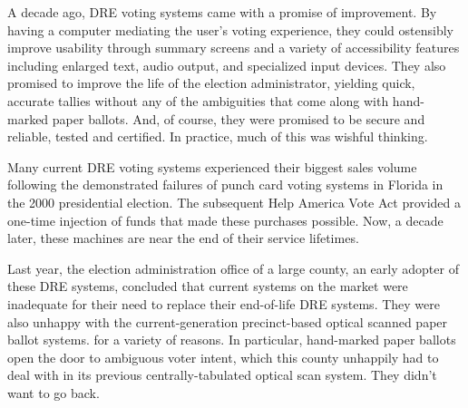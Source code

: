 \label{sec:intro}

A decade ago, DRE voting systems came with a promise of improvement. By having a
computer mediating the user's voting experience, they could ostensibly
improve usability through summary screens and a
variety of accessibility features including enlarged text, audio
output, and specialized input devices. They also promised to improve
the life of the election administrator, yielding quick, accurate tallies without
any of the ambiguities that come along with hand-marked paper ballots.
And, of course, they were promised to be secure and reliable, tested
and certified. In practice, much of this was wishful thinking.

Many current DRE voting systems experienced their biggest sales
volume following the demonstrated failures of punch card voting
systems in Florida in the 2000 presidential election. The subsequent Help America Vote Act
provided a one-time injection of funds that made these purchases
possible. Now, a decade later, these machines are near the end of
their service lifetimes. 

Last year, the election administration office of a large county, an
early adopter of these DRE systems, concluded that current
systems on the market were inadequate for their need to replace their
end-of-life DRE systems. They were also unhappy with the
current-generation precinct-based optical scanned paper ballot
systems.
for a variety of reasons. In particular, hand-marked paper ballots
open the door to ambiguous voter intent, which this county unhappily
had to deal with in its previous centrally-tabulated optical scan
system. They didn't want to go back.

